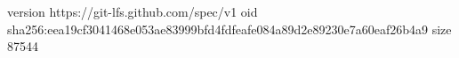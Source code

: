 version https://git-lfs.github.com/spec/v1
oid sha256:eea19cf3041468e053ae83999bfd4fdfeafe084a89d2e89230e7a60eaf26b4a9
size 87544
